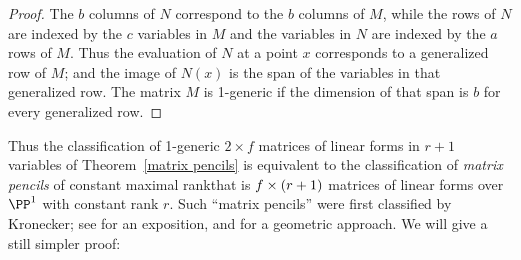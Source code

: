 \begin{proof}
The $b$ columns of $N$ correspond to the $b$ columns of $M$, while the
rows of $N$ are indexed
by the $c$ variables in $M$ and the variables in $N$ are indexed by the
$a$ rows of $M$. Thus the
evaluation of $N$ at a point $x$ corresponds to a generalized row of $M$;
and the image of $N(x)$
is the span of the variables in that generalized row. The matrix $M$
is 1-generic if the dimension
of that span is $b$ for every generalized row.
\end{proof}

Thus the classification of 1-generic $2\times f$ matrices of linear
forms in $r+1$ variables of Theorem~\ref{matrix pencils} is equivalent
to the classification
of \emph{matrix pencils} of constant maximal rank\emdash that is $f \times
\index{matrix pencil}%
(r+1)$ matrices of linear forms over $\PP^{1}$ with constant rank $r$.
Such ``matrix pencils'' were first classified by Kronecker; see
%
\cite[Chapter 12]{Gantmacher} for an exposition, and
\cite{Eisenbud-Harris-Centennial} for a geometric approach.
We will give a still simpler proof:

